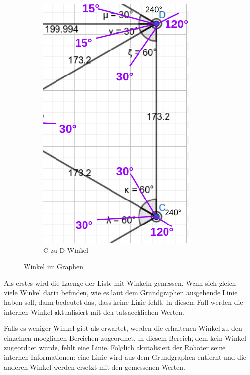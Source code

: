 \begin{figure}[H]
\begin{subfigure}{0.38\textwidth}
\includegraphics[width=0.95\linewidth]{assets/informatik-prototyp/c-d-angle.png} 
\caption{C zu D Winkel}
\label{fig:excerpt-angled-graph}
\end{subfigure}
\caption{Winkel im Graphen}
\label{fig:angles}
\end{figure}

Als erstes wird die Laenge der Liste mit Winkeln gemessen. Wenn sich gleich viele Winkel darin befinden, wie es laut dem Grundgraphen ausgehende Linie haben soll, dann bedeutet das, dass keine Linie fehlt. In diesem Fall werden die internen Winkel aktualisiert mit den tatsaechlichen Werten. 

Falls es weniger Winkel gibt als erwartet, werden die erhaltenen Winkel zu den einzelnen moeglichen Bereichen zugeordnet. In diesem Bereich, dem kein Winkel zugeordnet wurde, fehlt eine Linie. Folglich akutalisiert der Roboter seine internen Informationen: eine Linie wird aus dem Grundgraphen entfernt und die anderen Winkel werden ersetzt mit den gemessenen Werten.


